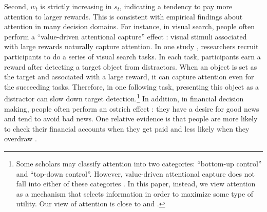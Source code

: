 \documentclass[
  12pt,
]{article}
\begin{document}
Second, \(w_t\) is strictly increasing in \(s_t\), indicating a tendency
to pay more attention to larger rewards. This is consistent with
empirical findings about attention in many decision domains. For
instance, in visual search, people often perform a ``value-driven
attentional capture'' effect
\citep{della2009learning, hickey2010reward, anderson2011value, chelazzi2013rewards, jahfari2017sensitivity}:
visual stimuli associated with large rewards naturally capture
attention. In one study \citep{anderson2011value}, researchers recruit
participants to do a series of visual search tasks. In each task,
participants earn a reward after detecting a target object from
distractors. When an object is set as the target and associated with a
large reward, it can capture attention even for the succeeding tasks.
Therefore, in one following task, presenting this object as a distractor
can slow down target detection.\footnote{Some scholars may classify
  attention into two categories: ``bottom-up control'' and ``top-down
  control''. However, value-driven attentional capture does not fall
  into either of these categories \citep{awh2012top}. In this paper,
  instead, we view attention as a mechanism that selects information in
  order to maximize some type of utility. Our view of attention is close
  to \citet{gottlieb2012attention} and \citet{gottlieb2013information}.}
In addition, in financial decision making, people often perform an
ostrich effect \citep{galai2006ostrich, karlsson2009ostrich}: they have
a desire for good news and tend to avoid bad news. One relative evidence
is that people are more likely to check their financial accounts when
they get paid and less likely when they overdraw
\citep{olafsson2017ostrich}.
\end{document}
